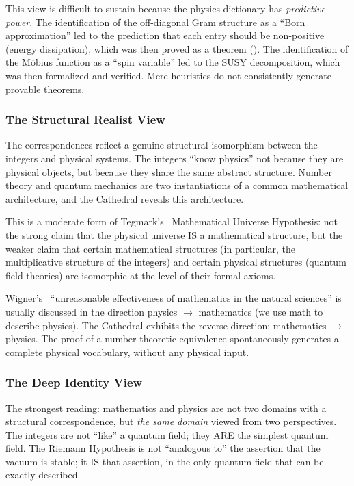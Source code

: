 This view is difficult to sustain because the physics dictionary
has \emph{predictive power}. The identification of the off-diagonal
Gram structure as a ``Born approximation'' led to the prediction
that each entry should be non-positive (energy dissipation), which
was then proved as a theorem (). The
identification of the Möbius function as a ``spin variable'' led
to the SUSY decomposition, which was then formalized and verified.
Mere heuristics do not consistently generate provable theorems.

\subsubsection{The Structural Realist View}

The correspondences reflect a genuine structural isomorphism between
the integers and physical systems. The integers ``know physics''
not because they are physical objects, but because they share the
same abstract structure. Number theory and quantum mechanics are
two instantiations of a common mathematical architecture, and the
Cathedral reveals this architecture.

This is a moderate form of Tegmark's~\cite{tegmark2008} Mathematical
Universe Hypothesis: not the strong claim that the physical universe
IS a mathematical structure, but the weaker claim that certain
mathematical structures (in particular, the multiplicative structure
of the integers) and certain physical structures (quantum field
theories) are isomorphic at the level of their formal axioms.

Wigner's~\cite{wigner1960} ``unreasonable effectiveness of
mathematics in the natural sciences'' is usually discussed in the
direction physics $\to$ mathematics (we use math to describe
physics). The Cathedral exhibits the reverse direction:
mathematics $\to$ physics. The proof of a number-theoretic
equivalence spontaneously generates a complete physical
vocabulary, without any physical input.

\subsubsection{The Deep Identity View}

The strongest reading: mathematics and physics are not two domains
with a structural correspondence, but \emph{the same domain}
viewed from two perspectives. The integers are not ``like'' a
quantum field; they ARE the simplest quantum field. The Riemann
Hypothesis is not ``analogous to'' the assertion that the vacuum
is stable; it IS that assertion, in the only quantum field that
can be exactly described.

